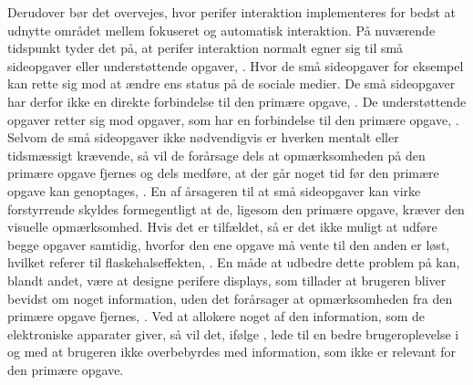 Derudover bør det overvejes, hvor perifer interaktion implementeres for bedst at udnytte området mellem fokuseret og automatisk interaktion. På nuværende tidspunkt tyder det på, at perifer interaktion normalt egner sig til små sideopgaver eller understøttende opgaver, \parencite[s. 21]{PDF:EvaluatingPI}. Hvor de små sideopgaver for eksempel kan rette sig mod at ændre ens status på de sociale medier. De små sideopgaver har derfor ikke en direkte forbindelse til den primære opgave, \parencite[s. 162]{PDF:ComparingInputModalities}. De understøttende opgaver retter sig mod opgaver, som har en forbindelse til den primære opgave, \parencite[s. 21]{PDF:EvaluatingPI}. Selvom de små sideopgaver ikke nødvendigvis er hverken mentalt eller tidsmæssigt krævende, så vil de forårsage dels at opmærksomheden på den primære opgave fjernes og dels medføre, at der går noget tid før den primære opgave kan genoptages, \parencite[s. 162]{PDF:ComparingInputModalities}. En af årsageren til at små sideopgaver kan virke forstyrrende skyldes formegentligt at de, ligesom den primære opgave, kræver den visuelle opmærksomhed. Hvis det er tilfældet, så er det ikke muligt at udføre begge opgaver samtidig, hvorfor den ene opgave må vente til den anden er løst, hvilket referer til flaskehalseffekten, \parencite[s. 240]{PDF:PICharacteristicsAndConsiderations}. En måde at udbedre dette problem på kan, blandt andet, være at designe perifere displays, som tillader at brugeren bliver bevidst om noget information, uden det forårsager at opmærksomheden fra den primære opgave fjernes, \parencite[s. 247]{PDF:AToolkitForManaging}. Ved at allokere noget af den information, som de elektroniske apparater giver, så vil det, ifølge \textcite[s. 55]{PDF:PeripheralInteraction}, lede til en bedre brugeroplevelse i og med at brugeren ikke overbebyrdes med information, som ikke er relevant for den primære opgave. 

